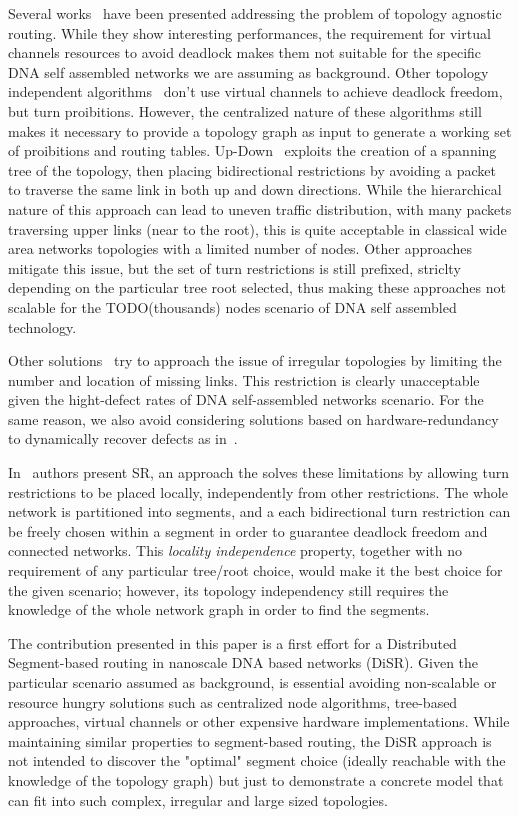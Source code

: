 Several works~\cite{} have been presented addressing the problem of topology
agnostic routing. While they show interesting
performances, the requirement for virtual channels resources 
to avoid deadlock makes them not suitable for the specific DNA self
assembled networks we are assuming as background.
Other topology independent algorithms~\cite{} don't use virtual channels to
achieve deadlock freedom, but turn proibitions. However,
the centralized nature of these algorithms still makes it necessary to
provide a topology graph as input to generate a working set
of proibitions and routing tables.
Up-Down~\cite{} exploits the creation of a spanning tree of the
topology, then placing bidirectional restrictions by avoiding a packet
to traverse the same link in both up and down directions.
While the hierarchical nature of this approach can lead to uneven traffic
distribution, with many packets traversing upper links (near to the
root), this is quite acceptable in classical wide area networks
topologies with a limited number of nodes. Other approaches~\cite{} mitigate this
issue, but the set of turn restrictions is still prefixed,
striclty depending on the particular tree root selected, thus making these
approaches not scalable for the TODO(thousands) nodes scenario of DNA
self assembled technology.

Other solutions~\cite{} try to approach the issue of irregular
topologies by limiting the number and location of missing links. This
restriction is clearly unacceptable given the hight-defect rates of
DNA self-assembled networks scenario. For the same reason, we also
avoid considering solutions based on hardware-redundancy to
dynamically recover defects as in~\cite{}. 

In~\cite{} authors present SR, an approach the solves these
limitations by allowing turn restrictions to be placed locally,
independently from other restrictions. The whole network is
partitioned into segments, and a each bidirectional turn
restriction can be freely chosen within a segment in order to guarantee
deadlock freedom and connected networks. This \emph{locality
independence} property, together with no requirement of any particular tree/root
choice, would make it the best choice for the given scenario;
however, its topology independency still requires the knowledge of the
whole network graph in order to find the segments. 

The contribution presented in this paper is a first effort for a
Distributed Segment-based routing in nanoscale DNA based networks
(DiSR). Given the particular scenario assumed as background, is essential
avoiding non-scalable or resource hungry solutions such as
centralized node algorithms, tree-based approaches, virtual channels
or other expensive hardware implementations. While maintaining similar
properties to segment-based routing, the DiSR approach is not intended
to discover the "optimal" segment choice (ideally reachable with the
knowledge of the topology graph) but just to demonstrate a concrete
model that can fit into such complex, irregular and large sized
topologies.

